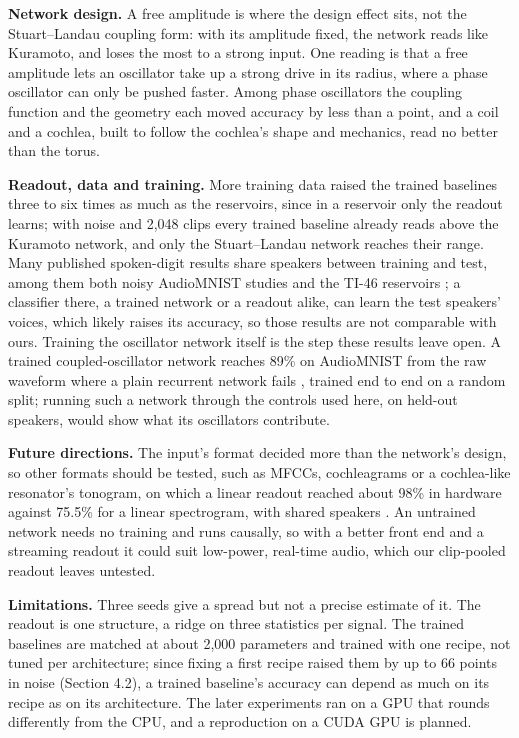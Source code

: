 \documentclass[10pt]{article}
\begin{document}
\textbf{Network design.} A free amplitude is where the design effect
sits, not the Stuart--Landau coupling form: with its amplitude fixed,
the network reads like Kuramoto, and loses the most to a strong input.
One reading is that a free amplitude lets an oscillator take up a strong
drive in its radius, where a phase oscillator can only be pushed faster.
Among phase oscillators the coupling function and the geometry each
moved accuracy by less than a point, and a coil and a cochlea, built to
follow the cochlea's shape and mechanics, read no better than the torus.

\textbf{Readout, data and training.} More training data raised the
trained baselines three to six times as much as the reservoirs, since in
a reservoir only the readout learns; with noise and 2,048 clips every
trained baseline already reads above the Kuramoto network, and only the
Stuart--Landau network reaches their range. Many published spoken-digit
results share speakers between training and test, among them both noisy
AudioMNIST studies \citep{beoletto2026, young2026} and the TI-46
reservoirs \citep{torrejon2017, opala2019, coulombe2017}; a classifier
there, a trained network or a readout alike, can learn the test
speakers' voices, which likely raises its accuracy, so those results are
not comparable with ours. Training the oscillator network itself is the
step these results leave open. A trained coupled-oscillator network
reaches 89\% on AudioMNIST from the raw waveform where a plain recurrent
network fails \citep{chandravadia2026}, trained end to end on a random
split; running such a network through the controls used here, on
held-out speakers, would show what its oscillators contribute.

\textbf{Future directions.} The input's format decided more than the
network's design, so other formats should be tested, such as MFCCs,
cochleagrams or a cochlea-like resonator's tonogram, on which a linear
readout reached about 98\% in hardware against 75.5\% for a linear
spectrogram, with shared speakers \citep{beoletto2026}. An untrained
network needs no training and runs causally, so with a better front end
and a streaming readout it could suit low-power, real-time audio, which
our clip-pooled readout leaves untested.

\textbf{Limitations.} Three seeds give a spread but not a precise
estimate of it. The readout is one structure, a ridge on three
statistics per signal. The trained baselines are matched at about 2,000
parameters and trained with one recipe, not tuned per architecture;
since fixing a first recipe raised them by up to 66 points in noise
(Section 4.2), a trained baseline's accuracy can depend as much on its
recipe as on its architecture. The later experiments ran on a GPU that
rounds differently from the CPU, and a reproduction on a CUDA GPU is
planned.
\end{document}
